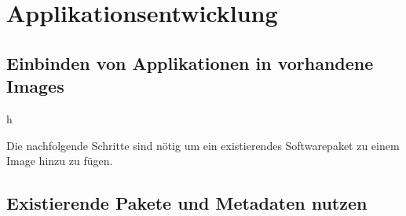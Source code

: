 \chapter{Applikationsentwicklung}
\label{chap:applikationsentwicklung}

\section{Einbinden von Applikationen in vorhandene Images}%
\label{sec:einbinden_von_applikationen_in_vorhandene_images}h

Die nachfolgende Schritte sind nötig um ein existierendes Softwarepaket zu einem
Image hinzu zu fügen.

\section{Existierende Pakete und Metadaten nutzen}%
\label{sec:existirende_pakete_und_metadaten}

